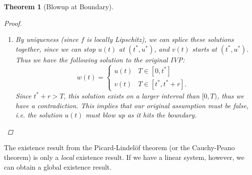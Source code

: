 \documentclass[12pt]{amsart}         %
\newtheorem{theorem}{Theorem}[section]
\theoremstyle{remark}
\begin{document}
\begin{theorem}[Blowup at Boundary]
\begin{proof}
\begin{enumerate}
\item By uniqueness (since $f$ is locally Lipschitz), we can splice these solutions together, since we can stop $u(t)$ at $(t^*, u^*)$, and $v(t)$ starts at $(t^*, u^*)$. Thus we have the following solution to the original IVP:
\[
w(t) = \begin{cases}
u(t) & T \in [0, t^*] \\
v(t) & T \in [t^*, t^* + r].
\end{cases}
\]
Since $t^* + r > T$, this solution exists on a larger interval than $[0, T)$, thus we have a contradiction. This implies that our original assumption must be false, i.e. the solution $u(t)$ must blow up as it hits the boundary.
\end{enumerate}
\end{proof}
\end{theorem}

The existence result from the Picard-Lindel\"{o}f theorem (or the Cauchy-Peano theorem) is only a \emph{local} existence result. If we have a linear system, however, we can obtain a global existence result. 
\end{document}
